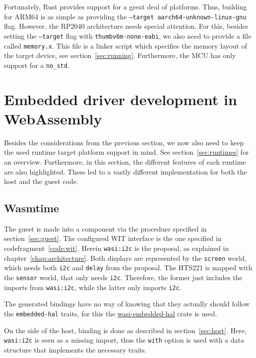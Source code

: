 Fortunately, Rust provides support for a great deal of platforms. Thus, building for ARM64 is as simple as providing the \texttt{--target aarch64-unknown-linux-gnu} flag. However, the RP2040 architecture needs special attention. For this, besides setting the \texttt{--target} flag with \texttt{thumbv6m-none-eabi}, we also need to provide a file called \texttt{memory.x}. 
This file is a linker script which specifies the memory layout of the target device, see section~\ref{sec:running}. Furthermore, the \gls{MCU} has only support for a \texttt{no\_std}.

\section{Embedded driver development in WebAssembly}
Besides the considerations from the previous section, we now also need to keep the used runtime target platform support in mind. See section~\ref{sec:runtimes} for an overview. Furthermore, in this section, the different features of each runtime are also highlighted. These led to a vastly different implementation for both the host and the guest code.

\subsection{Wasmtime}

The guest is made into a component via the procedure specified in section~\ref{sec:guest}. The configured \gls{WIT} interface is the one specified in codefragment~\ref{code:wit}. 
Herein \texttt{wasi:i2c} is the proposal, as explained in chapter~\ref{chap:architecture}. Both displays are represented by the \texttt{screen} world, which needs both \texttt{i2c} and \texttt{delay} from the proposal. The HTS221 is mapped with the \texttt{sensor} world, that only needs \texttt{i2c}. Therefore, the former just includes the imports from \texttt{wasi:i2c}, while the latter only imports \texttt{i2c}.

The generated bindings have no way of knowing that they actually should follow the \texttt{embedded-hal} traits, for this the \href{https://github.com/Zelzahn/wasi-embedded-hal}{wasi-embedded-hal} crate is used.

On the side of the host, binding is done as described in section~\ref{sec:host}. Here, \texttt{wasi:i2c} is seen as a missing import, thus the \texttt{with} option is used with a data structure that implements the necessary traits.

